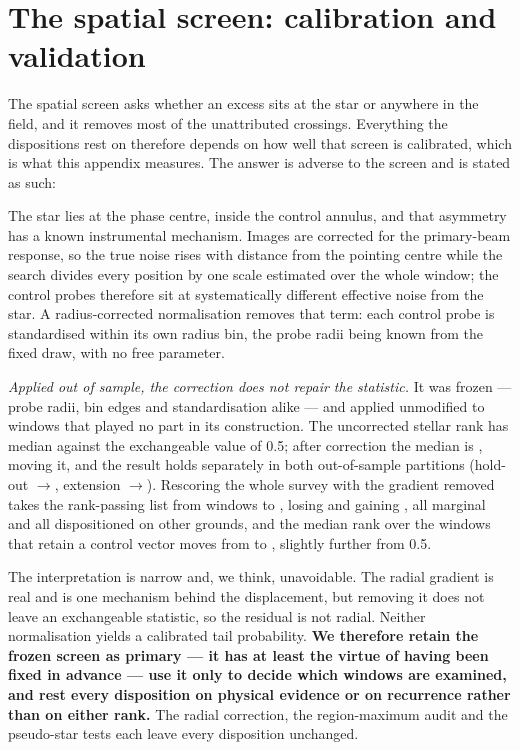 \section{The spatial screen: calibration and validation}
\label{app:radius}

The spatial screen asks whether an excess sits at the star or anywhere in the
field, and it removes most of the unattributed crossings. Everything the
dispositions rest on therefore depends on how well that screen is
calibrated, which is what this appendix measures. The answer is adverse to
the screen and is stated as such: \rankstatus{}

The star lies at the phase centre, inside the control annulus, and that
asymmetry has a known instrumental mechanism. Images are corrected for the
primary-beam response, so the true noise rises with distance from the
pointing centre while the search divides every position by one scale
estimated over the whole window; the control probes therefore sit at
systematically different effective noise from the star. A radius-corrected
normalisation removes that term: each control probe is standardised within
its own radius bin, the probe radii being known from the fixed draw, with no
free parameter.

\emph{Applied out of sample, the correction does not repair the statistic.}
It was frozen --- probe radii, bin edges and standardisation alike --- and
applied unmodified to \RadValStarN{} windows that played no part in its
construction. The uncorrected stellar rank has median \RadValStarRawMed{}
against the exchangeable value of 0.5; after correction the median is
\RadValStarCorMed, moving \RadValStarToward{} it, and the result holds
separately in both out-of-sample partitions (hold-out
\RadValStarHoRawMed$\to$\RadValStarHoCorMed, extension
\RadValStarExtRawMed$\to$\RadValStarExtCorMed). Rescoring the whole survey
with the gradient removed takes the rank-passing list from
\LocStageGlobal{} windows to \LocStageLocal, losing \LocStageLost{} and
gaining \LocStageGained, all marginal and all dispositioned on other
grounds, and the median rank over the \LocAllWin{} windows that retain a
control vector moves from \LocAllMedGlobal{} to \LocAllMedLocal, slightly
further from 0.5.

The interpretation is narrow and, we think, unavoidable. The radial gradient
is real and is one mechanism behind the displacement, but removing it does
not leave an exchangeable statistic, so the residual is not radial. Neither
normalisation yields a calibrated tail probability. \textbf{We therefore
retain the frozen screen as primary --- it has at least the virtue of having
been fixed in advance --- use it only to decide which windows are examined,
and rest every disposition on physical evidence or on recurrence rather than
on either rank.} The radial correction, the region-maximum audit and the
pseudo-star tests each leave every disposition unchanged.

